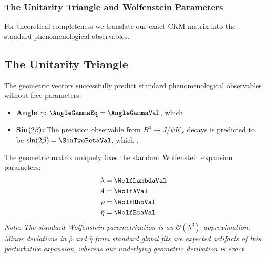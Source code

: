 \subsubsection{The Unitarity Triangle and Wolfenstein Parameters}

For theoretical completeness we translate our exact CKM matrix into the standard phenomenological observables.

\subsection{The Unitarity Triangle}
The geometric vectors successfully predict standard phenomenological observables without free parameters:
\begin{itemize}
    \item \textbf{Angle $\gamma$:} $\AngleGammaEq = \AngleGammaVal$, which \AngleGammaAccText
    \item \textbf{Sin($2\beta$):} The precision observable from $B^0 \to J/\psi K_S$ decays is predicted to be $\sin(2\beta) = \SinTwoBetaVal$, which \SinTwoBetaAccText.
\end{itemize}

The geometric matrix uniquely fixes the standard Wolfenstein expansion parameters:
\begin{equation}
\begin{split}
    \lambda &= \WolfLambdaVal \\
    A &= \WolfAVal \\
    \bar{\rho} &= \WolfRhoVal \\
    \bar{\eta} &= \WolfEtaVal
\end{split}
\end{equation}
\textit{Note: The standard Wolfenstein parametrization is an $\mathcal{O}(\lambda^3)$ approximation. Minor deviations in $\bar{\rho}$ and $\bar{\eta}$ from standard global fits are expected artifacts of this perturbative expansion, whereas our underlying geometric derivation is exact.}